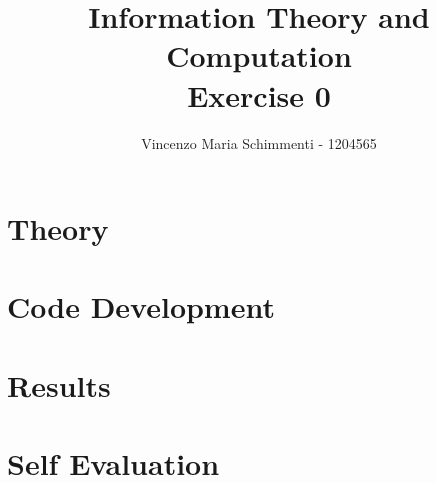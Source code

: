 \documentclass{article}
\title{%
	Information Theory and Computation \\
	Exercise  0}
\author{Vincenzo Maria Schimmenti - 1204565}
\begin{document}
\maketitle
 
\section*{Theory}
\section*{Code Development}
\section*{Results}
\section*{Self Evaluation}
 
\end{document}
